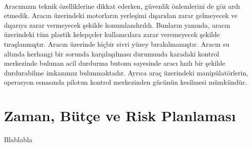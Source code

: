 \documentclass[12pt]{article}
\begin{document}
\paragraph{} Aracımızın teknik özelliklerine dikkat ederken, güvenlik önlemlerini de göz ardı etmedik. Aracın üzerindeki motorların yerleşimi dışarıdan zarar gelmeyecek ve dışarıya zarar vermeyecek şekilde konumlandırıldı. Bunların yanında, aracın üzerindeki tüm plastik kelepçeler kullanıcılara zarar veremeyecek şekilde tıraşlanmıştır. Aracın üzerinde hiçbir sivri yüzey bırakılmamıştır. Aracın su altında herhangi bir sorunda karşılaşılması durumunda karadaki kontrol merkezinde bulunan acil durdurma butonu sayesinde aracı hızlı bir şekilde durdurabilme imkanımız bulunmaktadır. Ayrıca araç üzerindeki manipülatörlerin, operasyon esnasında pilotun kontrol merkezinden gücünün kesilmesi mümkündür.


\section{Zaman, Bütçe ve Risk Planlaması}

\paragraph{} Blablabla
\end{document}
